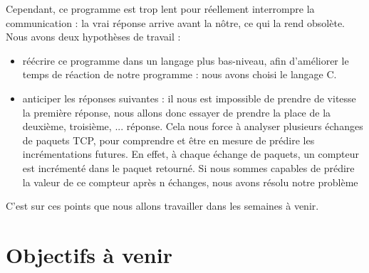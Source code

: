 \documentclass[a4paper, 12pt,twoside]{article}
\begin{document}
	Cependant, ce programme est trop lent pour réellement interrompre la communication : la vrai réponse arrive avant la nôtre, ce qui la rend obsolète. Nous avons deux hypothèses de travail : \begin{itemize}
		\item réécrire ce programme dans un langage plus bas-niveau, afin d'améliorer le temps de réaction de notre programme : nous avons choisi le langage C.
		\item anticiper les réponses suivantes : il nous est impossible de prendre de vitesse la première réponse, nous allons donc essayer de prendre la place de la deuxième, troisième, ... réponse. Cela nous force à analyser plusieurs échanges de paquets TCP, pour comprendre et être en mesure de prédire les incrémentations futures. En effet, à chaque échange de paquets, un compteur est incrémenté dans le paquet retourné. Si nous sommes capables de prédire la valeur de ce compteur après n échanges, nous avons résolu notre problème
	\end{itemize}
	
	C'est sur ces points que nous allons travailler dans les semaines à venir.

\section{Objectifs à venir}
\end{document}
